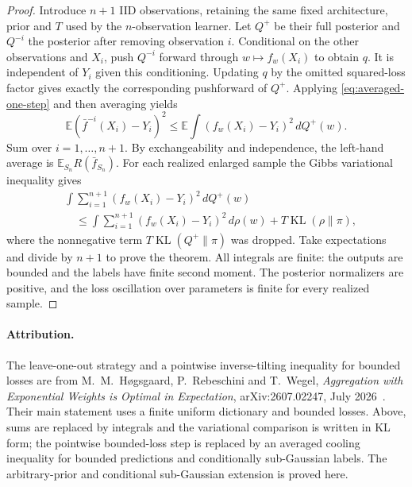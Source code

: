 \begin{proof}
Introduce $n+1$ IID observations, retaining the same fixed architecture,
prior and $T$ used by the $n$-observation learner. Let $Q^+$ be their full
posterior and $Q^{-i}$ the posterior after removing observation $i$.
Conditional on the other observations and $X_i$, push $Q^{-i}$ forward
through $w\mapsto f_w(X_i)$ to obtain $q$. It is independent of $Y_i$
given this conditioning. Updating $q$ by the omitted squared-loss factor
gives exactly the corresponding pushforward of $Q^+$.
Applying \eqref{eq:averaged-one-step} and then averaging yields
\[
 \mathbb E (\bar f^{-i}(X_i)-Y_i)^2
 \le\mathbb E\int(f_w(X_i)-Y_i)^2\,dQ^+(w).
\]
Sum over $i=1,\ldots,n+1$. By exchangeability and independence, the
left-hand average is $\mathbb E_{S_n}R(\bar f_{S_n})$.
For each realized enlarged sample the Gibbs variational inequality gives
\begin{align*}
 &\int\sum_{i=1}^{n+1}(f_w(X_i)-Y_i)^2\,dQ^+(w)\\
 &\quad\le\int\sum_{i=1}^{n+1}(f_w(X_i)-Y_i)^2\,d\rho(w)
             +T\operatorname{KL}(\rho\|\pi),
\end{align*}
where the nonnegative term $T\operatorname{KL}(Q^+\|\pi)$ was dropped.
Take expectations and divide by $n+1$ to prove the theorem.
All integrals are finite: the outputs are bounded and the labels have
finite second moment. The posterior normalizers are positive, and the
loss oscillation over parameters is finite for every realized sample.
\end{proof}

\paragraph{Attribution.}
The leave-one-out strategy and a pointwise inverse-tilting inequality
for bounded losses are from M.~M.~H\o gsgaard, P.~Rebeschini and
T.~Wegel, \emph{Aggregation with Exponential Weights is Optimal in
Expectation}, arXiv:2607.02247, July 2026~\cite{hogsgaard}. Their main statement uses a
finite uniform dictionary and bounded losses. Above, sums are replaced
by integrals and the variational comparison is written in KL form;
the pointwise bounded-loss step is replaced by an averaged cooling
inequality for bounded predictions and conditionally sub-Gaussian
labels. The arbitrary-prior and conditional sub-Gaussian extension is proved here.
